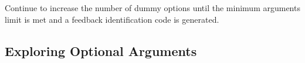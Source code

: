 Continue to increase the number of dummy options until the minimum arguments limit is met and a feedback identification code is generated.

\fi %

\iftrue

\subsection{Exploring Optional Arguments} %




